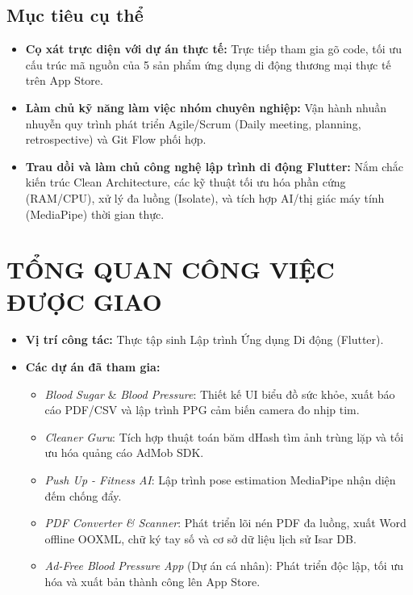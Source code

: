 \documentclass[12pt, a4paper]{article}
\begin{document}
\subsection{Mục tiêu cụ thể}
\begin{itemize}
    \item \textbf{Cọ xát trực diện với dự án thực tế:} Trực tiếp tham gia gõ code, tối ưu cấu trúc mã nguồn của 5 sản phẩm ứng dụng di động thương mại thực tế trên App Store.
    \item \textbf{Làm chủ kỹ năng làm việc nhóm chuyên nghiệp:} Vận hành nhuần nhuyễn quy trình phát triển Agile/Scrum (Daily meeting, planning, retrospective) và Git Flow phối hợp.
    \item \textbf{Trau dồi và làm chủ công nghệ lập trình di động Flutter:} Nắm chắc kiến trúc Clean Architecture, các kỹ thuật tối ưu hóa phần cứng (RAM/CPU), xử lý đa luồng (Isolate), và tích hợp AI/thị giác máy tính (MediaPipe) thời gian thực.
\end{itemize}

\section{TỔNG QUAN CÔNG VIỆC ĐƯỢC GIAO}
\begin{itemize}
    \item \textbf{Vị trí công tác:} Thực tập sinh Lập trình Ứng dụng Di động (Flutter).
    \item \textbf{Các dự án đã tham gia:}
    \begin{itemize}
        \item \textit{Blood Sugar} \& \textit{Blood Pressure}: Thiết kế UI biểu đồ sức khỏe, xuất báo cáo PDF/CSV và lập trình PPG cảm biến camera đo nhịp tim.
        \item \textit{Cleaner Guru}: Tích hợp thuật toán băm dHash tìm ảnh trùng lặp và tối ưu hóa quảng cáo AdMob SDK.
        \item \textit{Push Up - Fitness AI}: Lập trình pose estimation MediaPipe nhận diện đếm chống đẩy.
        \item \textit{PDF Converter \& Scanner}: Phát triển lõi nén PDF đa luồng, xuất Word offline OOXML, chữ ký tay số và cơ sở dữ liệu lịch sử Isar DB.
        \item \textit{Ad-Free Blood Pressure App} (Dự án cá nhân): Phát triển độc lập, tối ưu hóa và xuất bản thành công lên App Store.
    \end{itemize}
\end{itemize}
\end{document}
